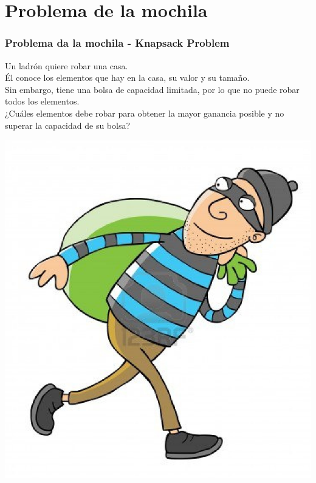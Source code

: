 \documentclass{beamer}
\begin{document}
\section[Knapsack]{Problema de la mochila}
	\begin{frame}
		\frametitle{Problema da la mochila - Knapsack Problem}
		Un ladrón quiere robar una casa.\\
		Él conoce los elementos que hay en la casa, su valor y su tamaño.\\
		Sin embargo, tiene una bolsa de capacidad limitada, por lo que no puede robar todos los elementos.\\
		¿Cuáles elementos debe robar para obtener la mayor ganancia posible y no superar la capacidad de su bolsa?\\
		\begin{center} \includegraphics[height = 0.4\textheight]{thief.jpg} \end{center}
	\end{frame}
\end{document}
